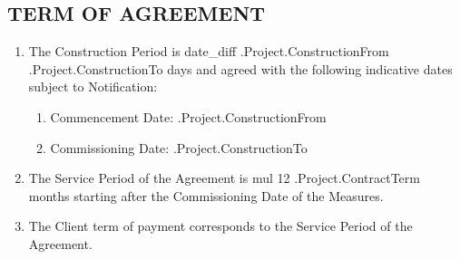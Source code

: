 \subsection{TERM OF AGREEMENT}
\begin{enumerate}
	\item	The Construction Period is {{date_diff .Project.ConstructionFrom .Project.ConstructionTo}} days and agreed with the following indicative dates subject to Notification:
	\begin{enumerate}
		\item	Commencement Date:  \iffalse input project.construction_from value="{{.Project.ConstructionFrom}}" type="date" \fi {{.Project.ConstructionFrom}}
		\item	Commissioning Date: \iffalse input project.construction_to value="{{.Project.ConstructionTo}}" type="date" \fi {{.Project.ConstructionTo}}
	\end{enumerate}
\item	The Service Period of the Agreement is {{mul 12 .Project.ContractTerm}} months starting after the Commissioning Date of the Measures.
	\item	The Client term of payment corresponds to the Service Period of the Agreement.
\end{enumerate}

